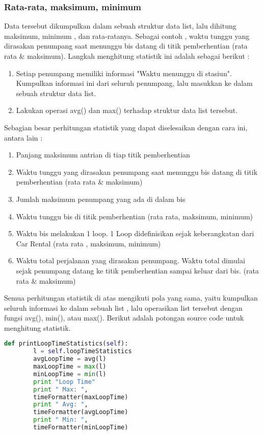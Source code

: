 \documentclass{article}
\begin{document}
\subsubsection{Rata-rata, maksimum, minimum}
Data tersebut dikumpulkan dalam sebuah struktur data list, lalu dihitung maksimum, minimum , dan rata-ratanya.
Sebagai contoh , waktu tunggu yang dirasakan penumpang saat menunggu bis datang di titik pemberhentian (rata rata \& maksimum).
Langkah menghitung statistik ini adalah sebagai berikut :
\begin{enumerate}
\item Setiap penumpang memiliki informasi "Waktu menunggu di stasiun". Kumpulkan informasi ini dari seluruh penumpang, lalu masukkan ke dalam sebuah struktur data list.
\item Lakukan operasi avg() dan max() terhadap struktur data list tersebut.
\end{enumerate}
Sebagian besar perhitungan statistik yang dapat diselesaikan dengan cara ini, antara lain :
	\begin{enumerate}
	\item Panjang maksimum antrian di tiap titik pemberhentian 
	\item Waktu tunggu yang dirasakan penumpang saat menunggu bis datang di titik pemberhentian (rata rata \& maksimum)
	\item Jumlah maksimum penumpang yang ada di dalam bis 
	\item Waktu tunggu bis di titik pemberhentian (rata rata, maksimum, minimum)
	\item Waktu bis melakukan 1 loop. 1 Loop didefinisikan sejak keberangkatan dari Car Rental (rata rata , maksimum, minimum)
	\item Waktu total perjalanan yang dirasakan penumpang. Waktu total dimulai sejak penumpang datang ke titik pemberhentian sampai keluar dari bis. (rata rata \& maksimum)
	\end{enumerate}
	Semua perhitungan statistik di atas mengikuti pola yang sama, yaitu kumpulkan seluruh informasi ke dalam sebuah list , lalu operasikan list tersebut dengan fungsi avg(), min(), atau max(). Berikut adalah potongan source code untuk menghitung statistik.
\begin{lstlisting}[language=Python]
def printLoopTimeStatistics(self):
		l = self.loopTimeStatistics
		avgLoopTime = avg(l)
		maxLoopTime = max(l)
		minLoopTime = min(l)
		print "Loop Time"
		print "	Max: ",
		timeFormatter(maxLoopTime)
		print "	Avg: ",
		timeFormatter(avgLoopTime)			
		print "	Min: ",
		timeFormatter(minLoopTime)
\end{lstlisting}
\end{document}
